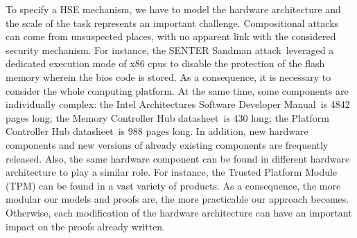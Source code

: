 To specify a HSE mechanism, we have to model the hardware architecture and the
scale of the task represents an important challenge.
%
Compositional attacks can come from unsuspected places, with no apparent link
with the considered security mechanism.
%
For instance, the SENTER Sandman attack\,\cite{kovah2015senter} leveraged a
dedicated execution mode of x86 \acp{cpu} to disable the protection of the flash
memory wherein the \ac{bios} code is stored.
%
As a consequence, it is necessary to consider the whole computing platform.
%
At the same time, some components are individually complex:
%
the Intel Architectures Software Developer Manual\,\cite{intel2014manual} is
4842 pages long;
%
the Memory Controller Hub datasheet\,\cite{intel2009mch} is 430  long;
%
the Platform Controller Hub datasheet\,\cite{intel2012pch} is 988 pages long.
%
In addition, new hardware components and new versions of already existing
components are frequently released.
%
Also, the same
hardware component can be found in different hardware architecture to play a
similar role.
%
For instance, the Trusted Platform Module (TPM) can be found in a vast variety
of products.
%
As a consequence, the more modular our models and proofs are, the more
practicable our approach becomes.
%
Otherwise, each modification of the hardware architecture can have an important
impact on the proofs already written.

